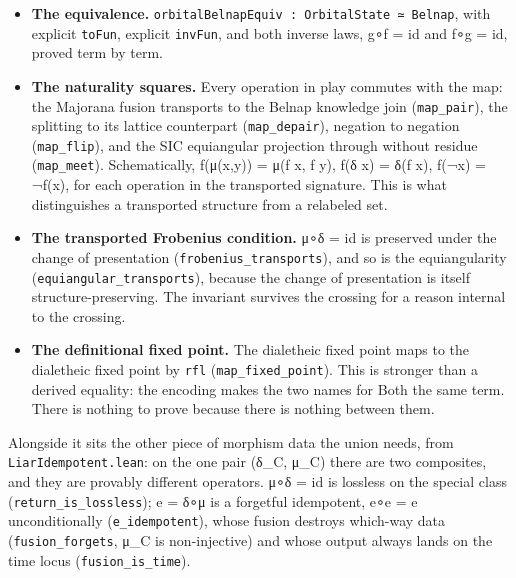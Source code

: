 \begin{itemize}
\tightlist
\item
  \textbf{The equivalence.}
  \texttt{orbitalBelnapEquiv\ :\ OrbitalState\ ≃\ Belnap}, with explicit
  \texttt{toFun}, explicit \texttt{invFun}, and both inverse laws, g∘f =
  id and f∘g = id, proved term by term.
\item
  \textbf{The naturality squares.} Every operation in play commutes with
  the map: the Majorana fusion transports to the Belnap knowledge join
  (\texttt{map\_pair}), the splitting to its lattice counterpart
  (\texttt{map\_depair}), negation to negation (\texttt{map\_flip}), and
  the SIC equiangular projection through without residue
  (\texttt{map\_meet}). Schematically, f(μ(x,y)) = μ(f x, f y), f(δ x) =
  δ(f x), f(¬x) = ¬f(x), for each operation in the transported
  signature. This is what distinguishes a transported structure from a
  relabeled set.
\item
  \textbf{The transported Frobenius condition.} μ∘δ = id is preserved
  under the change of presentation (\texttt{frobenius\_transports}), and
  so is the equiangularity (\texttt{equiangular\_transports}), because
  the change of presentation is itself structure-preserving. The
  invariant survives the crossing for a reason internal to the crossing.
\item
  \textbf{The definitional fixed point.} The dialetheic fixed point maps
  to the dialetheic fixed point by \texttt{rfl}
  (\texttt{map\_fixed\_point}). This is stronger than a derived
  equality: the encoding makes the two names for Both the same term.
  There is nothing to prove because there is nothing between them.
\end{itemize}

Alongside it sits the other piece of morphism data the union needs, from
\texttt{LiarIdempotent.lean}: on the one pair (δ\_C, μ\_C) there are two
composites, and they are provably different operators. μ∘δ = id is
lossless on the special class (\texttt{return\_is\_lossless}); e = δ∘μ
is a forgetful idempotent, e∘e = e unconditionally
(\texttt{e\_idempotent}), whose fusion destroys which-way data
(\texttt{fusion\_forgets}, μ\_C is non-injective) and whose output
always lands on the time locus (\texttt{fusion\_is\_time}).

